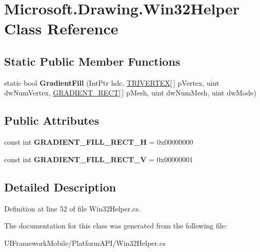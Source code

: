 \hypertarget{class_microsoft_1_1_drawing_1_1_win32_helper}{
\section{Microsoft.Drawing.Win32Helper Class Reference}
\label{class_microsoft_1_1_drawing_1_1_win32_helper}
}
\subsection*{Static Public Member Functions}
\begin{DoxyCompactItemize}
\item 
\hypertarget{class_microsoft_1_1_drawing_1_1_win32_helper_aedecc71943b7446bb1a8601512cd8351}{
static bool {\bfseries GradientFill} (IntPtr hdc, \hyperlink{struct_microsoft_1_1_drawing_1_1_t_r_i_v_e_r_t_e_x}{TRIVERTEX}\mbox{[}$\,$\mbox{]} pVertex, uint dwNumVertex, \hyperlink{struct_microsoft_1_1_drawing_1_1_g_r_a_d_i_e_n_t___r_e_c_t}{GRADIENT\_\-RECT}\mbox{[}$\,$\mbox{]} pMesh, uint dwNumMesh, uint dwMode)}
\label{class_microsoft_1_1_drawing_1_1_win32_helper_aedecc71943b7446bb1a8601512cd8351}

\end{DoxyCompactItemize}
\subsection*{Public Attributes}
\begin{DoxyCompactItemize}
\item 
\hypertarget{class_microsoft_1_1_drawing_1_1_win32_helper_a7f507323adb68c831477f76a6ecb0145}{
const int {\bfseries GRADIENT\_\-FILL\_\-RECT\_\-H} = 0x00000000}
\label{class_microsoft_1_1_drawing_1_1_win32_helper_a7f507323adb68c831477f76a6ecb0145}

\item 
\hypertarget{class_microsoft_1_1_drawing_1_1_win32_helper_ac72dab25ac8e5b97f679448c0f1f466d}{
const int {\bfseries GRADIENT\_\-FILL\_\-RECT\_\-V} = 0x00000001}
\label{class_microsoft_1_1_drawing_1_1_win32_helper_ac72dab25ac8e5b97f679448c0f1f466d}

\end{DoxyCompactItemize}


\subsection{Detailed Description}


Definition at line 52 of file Win32Helper.cs.

The documentation for this class was generated from the following file:\begin{DoxyCompactItemize}
\item 
UIFrameworkMobile/PlatformAPI/Win32Helper.cs\end{DoxyCompactItemize}
